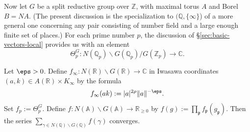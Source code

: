 Now let $G$ be a split reductive group over $\mathbb{Z}$, with maximal torus $A$ and Borel $B = N A$.  (The present discussion is the specialization to $(\mathbb{Q}, \{\infty \}$) of a more general one concerning any pair consisting of number field and a large enough finite set of places.)  For each prime number $p$, the discussion of \S\ref{sec:basic-vectors-local} provides us with an element
\begin{equation*}
  \Theta^G_p  : N(\mathbb{Q}_p) \backslash G(\mathbb{Q}_p) / G(\mathbb{Z}_p) \rightarrow \mathbb{C}.
\end{equation*}


\begin{lemma}\label{lem:sub-gln:let-m-in}
  Let $\eps > 0$.  Define $f_\infty : N(\mathbb{R}) \backslash G(\mathbb{R}) \rightarrow \mathbb{C}$ in Iwasawa coordinates $(a,k) \in A(\mathbb{R}) \times K_\infty$ by the formula
  \begin{equation*}
    f_\infty(a k) := |a|^{2 \rho} \|a\|^{-\eps}.
  \end{equation*}
  Set $f_p := \Theta_p^G$.  Define $f : N(\mathbb{A}) \backslash G(\mathbb{A}) \rightarrow \mathbb{R}_{\geq 0}$ by $f(g) := \prod_\mathfrak{p} f_\mathfrak{p}(g_\mathfrak{p})$.  Then the series $\sum_{\gamma \in N(\mathbb{Q}) \backslash G(\mathbb{Q})} f(\gamma)$ converges.
\end{lemma}
